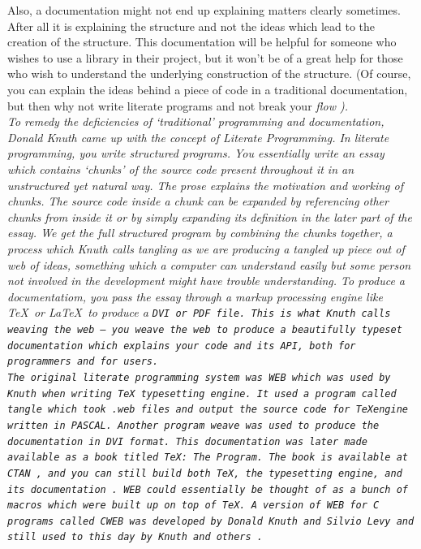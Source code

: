 Also, a documentation might not end up explaining matters clearly sometimes. After all it is explaining the
structure and not the ideas which lead to the creation of the structure. This documentation will be helpful
for someone who wishes to use a library in their project, but it won't be of a great help for those who wish
to understand the underlying construction of the structure. (Of course, you can explain the ideas behind a
piece of code in a traditional documentation, but then why not write literate programs and not break your \it
flow \rm).\\

To remedy the deficiencies of `traditional' programming and documentation, Donald Knuth came up with the
concept of \it Literate Programming\rm  \cite{knuth1984literate}. In literate programming, you write
structured programs. You essentially write an essay which contains `chunks' of the source code present
throughout it in an unstructured yet \it natural \rm way. The prose explains the motivation and working of
chunks. The source code inside a chunk can be expanded by referencing other chunks from inside it or by simply
expanding its definition in the later part of the essay. We get the full structured program by combining the
chunks together, a process which Knuth calls \it tangling \rm as we are producing a tangled up piece out of
web of ideas, something which a computer can understand easily but some person not involved in the development
might have trouble understanding. To produce a documentatiom, you pass the essay through a markup processing
engine like \TeX \ or \LaTeX \ to produce a \tt DVI \rm or \tt PDF \rm file. This is what Knuth calls \it
weaving \rm the web --- you weave the web to produce a beautifully typeset documentation which explains your
code and its API, both for programmers and for users.\\

The original literate programming system was \tt WEB \rm which was used by Knuth when writing \TeX \
typesetting engine. It used a program called \tt tangle \rm which took \tt .web \rm files and output the
source code for \TeX engine written in PASCAL. Another program \tt weave \rm was used to produce the
documentation in \tt DVI \rm format. This documentation was later made available as a book titled \it \TeX :
The Program\rm. The book is available at \tt CTAN \rm, and you can still build both \TeX , the typesetting
engine, and its documentation \cite{knuth1984tex}. \tt WEB \rm could essentially be thought of as a bunch of
macros which were built up on top of \TeX. A version of \tt WEB \rm for C programs called \tt CWEB \rm was
developed by Donald Knuth and Silvio Levy and still used to this day by Knuth and others 
\cite{knuth1992literate}.\\

